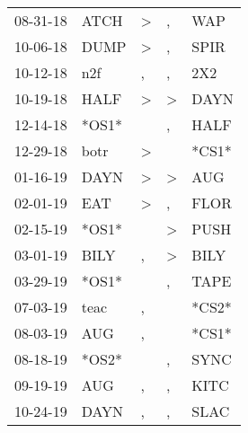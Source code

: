 \begin{supertabular}{p{0.07\textwidth}p{0.06\textwidth}p{0.02\textwidth}p{0.02\textwidth}p{0.06\textwidth}}
 08-31-18\textsuperscript{} &  ATCH\textsuperscript{} &  \textgreater &             , &            WAP\textsuperscript{} \\
 10-06-18\textsuperscript{} &  DUMP\textsuperscript{} &  \textgreater &             , &           SPIR\textsuperscript{} \\
 10-12-18\textsuperscript{} &   n2f\textsuperscript{} &             , &             , &            2X2\textsuperscript{} \\
 10-19-18\textsuperscript{} &  HALF\textsuperscript{} &  \textgreater &  \textgreater &           DAYN\textsuperscript{} \\
 12-14-18\textsuperscript{} &                   *OS1* &               &             , &           HALF\textsuperscript{} \\
 12-29-18\textsuperscript{} &  botr\textsuperscript{} &  \textgreater &               &                            *CS1* \\
 01-16-19\textsuperscript{} &  DAYN\textsuperscript{} &  \textgreater &  \textgreater &            AUG\textsuperscript{} \\
 02-01-19\textsuperscript{} &   EAT\textsuperscript{} &  \textgreater &             , &           FLOR\textsuperscript{} \\
 02-15-19\textsuperscript{} &                   *OS1* &               &  \textgreater &           PUSH\textsuperscript{} \\
 03-01-19\textsuperscript{} &  BILY\textsuperscript{} &             , &  \textgreater &           BILY\textsuperscript{} \\
 03-29-19\textsuperscript{} &                   *OS1* &               &             , &           TAPE\textsuperscript{} \\
 07-03-19\textsuperscript{} &  teac\textsuperscript{} &             , &               &                            *CS2* \\
 08-03-19\textsuperscript{} &   AUG\textsuperscript{} &             , &               &                            *CS1* \\
 08-18-19\textsuperscript{} &                   *OS2* &               &             , &           SYNC\textsuperscript{} \\
 09-19-19\textsuperscript{} &   AUG\textsuperscript{} &             , &             , &           KITC\textsuperscript{} \\
 10-24-19\textsuperscript{} &  DAYN\textsuperscript{} &             , &             , &           SLAC\textsuperscript{} \\

\end{supertabular}
